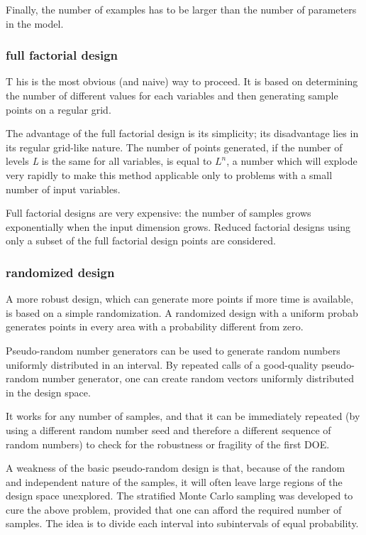 \documentclass[10pt]{article}
\begin{document}
Finally, the number of examples has to be larger than the number of parameters in the model.

\subsubsection{full factorial design}
T his is the most obvious (and naive) way to proceed. It is based on determining the number of different values for each variables and then generating sample points on a regular grid.

The advantage of the full factorial design is its simplicity; its disadvantage lies in its regular grid-like nature. 
The number of points generated, if the number of levels \textit{L} is the same for all variables, is equal to $ L^n $, a number which will explode very rapidly to make this method applicable only to problems with a small number of input variables.

Full factorial designs are very expensive: the number of samples
grows exponentially when the input dimension grows. Reduced factorial designs using only a subset of the full factorial design points are considered.

\subsubsection{randomized design}
A more robust design, which can generate more points if more time is available, is based on a simple randomization. A randomized design with a uniform probab generates points in every area with a probability different from zero.

Pseudo-random number generators can be used to generate random numbers uniformly distributed in an interval. By repeated calls of a good-quality pseudo-random number generator, one can create random
vectors uniformly distributed in the design space.

It works for any number of samples, and that it can be immediately repeated (by using a different random number seed and therefore a different sequence of random numbers) to check for the robustness or fragility of the first DOE.

A weakness of the basic pseudo-random design is that, because of the random and independent nature of the samples, it will often leave large regions of the design space unexplored. The stratified Monte Carlo sampling was developed to cure the above problem, provided that one can afford the required number of samples. The idea is to divide each interval into subintervals of equal probability.
\end{document}
